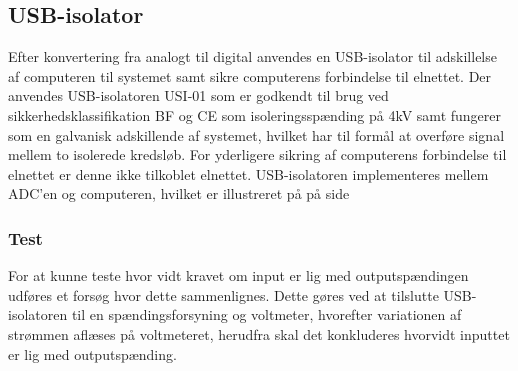 \subsection{USB-isolator}
Efter konvertering fra analogt til digital anvendes en USB-isolator til adskillelse af computeren til systemet samt sikre computerens forbindelse til elnettet. 
Der anvendes USB-isolatoren USI-01 som er godkendt til brug ved sikkerhedsklassifikation BF og CE som isoleringsspænding på 4kV samt fungerer som en galvanisk adskillende af systemet, hvilket har til formål at overføre signal mellem to isolerede kredsløb. For yderligere sikring af computerens forbindelse til elnettet er denne ikke tilkoblet elnettet. USB-isolatoren implementeres mellem ADC'en og computeren, hvilket er illustreret på  på side \pageref{blokdiagram}
\subsubsection{Test}
For at kunne teste hvor vidt kravet om input er lig med outputspændingen udføres et forsøg hvor dette sammenlignes. Dette gøres ved at tilslutte USB-isolatoren til en spændingsforsyning og voltmeter, hvorefter variationen af strømmen  aflæses på voltmeteret, herudfra skal det konkluderes hvorvidt inputtet er lig med outputspænding. 

